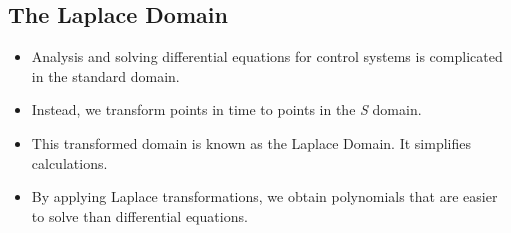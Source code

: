 \documentclass[a4paper, 11pt]{article}
\begin{document}
	\subsection{The Laplace Domain}
	\begin{itemize}
		\item Analysis and solving differential equations for control systems is complicated in the standard domain.
		\item Instead, we transform points in time to points in the \textit{S} domain. 
		\item This transformed domain is known as the Laplace Domain. It simplifies calculations.
		\item By applying Laplace transformations, we obtain polynomials that are easier to solve than differential equations.
	\end{itemize}
	
	
\end{document}
